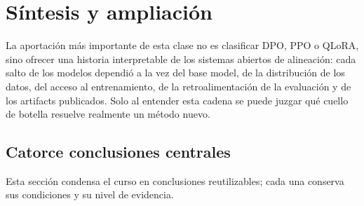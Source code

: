\section{Síntesis y ampliación}

La aportación más importante de esta clase no es clasificar DPO, PPO o QLoRA, sino ofrecer una historia interpretable de los sistemas abiertos de alineación: cada salto de los modelos dependió a la vez del base model, de la distribución de los datos, del acceso al entrenamiento, de la retroalimentación de la evaluación y de los artifacts publicados. Solo al entender esta cadena se puede juzgar qué cuello de botella resuelve realmente un método nuevo.

\subsection{Catorce conclusiones centrales}

Esta sección condensa el curso en conclusiones reutilizables; cada una conserva sus condiciones y su nivel de evidencia.


